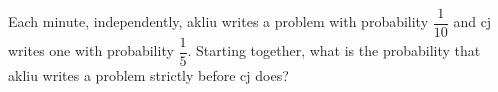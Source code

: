 Each minute, independently, akliu writes a problem with probability $\dfrac1{10}$ and cj writes one with probability $\dfrac15$. Starting together, what is the probability that akliu writes a problem strictly before cj does?

